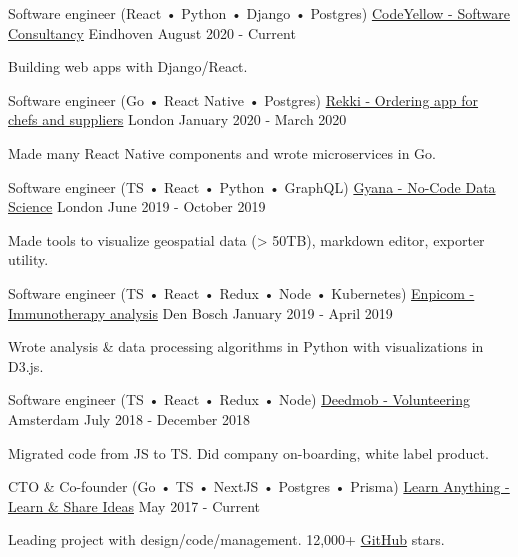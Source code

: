 
\begin{cventries}

  \cventry
    {Software engineer (React • Python • Django • Postgres)}
    {\href{https://codeyellow.nl}{CodeYellow - Software Consultancy}}
    {Eindhoven}
    {August 2020 - Current}
     {
      \begin{cvitems}
        \item {Building web apps with Django/React.}
      \end{cvitems}
    }

  \cventry
    {Software engineer (Go • React Native • Postgres)}
    {\href{https://www.rekki.com}{Rekki - Ordering app for chefs and suppliers}}
    {London}
    {January 2020 - March 2020}
     {
      \begin{cvitems}
        \item {Made many React Native components and wrote microservices in Go.}
      \end{cvitems}
    }

  \cventry
    {Software engineer (TS • React • Python • GraphQL)}
    {\href{https://www.gyana.com}{Gyana - No-Code Data Science}}
    {London}
    {June 2019 - October 2019}
     {
      \begin{cvitems}
        \item {Made tools to visualize geospatial data (> 50TB), markdown editor, exporter utility.}
      \end{cvitems}
    }

  \cventry
    {Software engineer (TS • React • Redux • Node • Kubernetes)}
    {\href{https://www.enpicom.com}{Enpicom - Immunotherapy analysis}}
    {Den Bosch}
    {January 2019 - April 2019}
     {
      \begin{cvitems}
        \item {Wrote analysis \& data processing algorithms in Python with visualizations in D3.js.}
      \end{cvitems}
    }

  \cventry
    {Software engineer (TS • React • Redux • Node)}
    {\href{https://www.deedmob.com}{Deedmob - Volunteering}}
    {Amsterdam}
    {July 2018 - December 2018}
     {
      \begin{cvitems}
        \item {Migrated code from JS to TS. Did company on-boarding, white label product.}
      \end{cvitems}
    }

  \cventry
    {CTO \& Co-founder (Go • TS • NextJS • Postgres • Prisma)}
    {\href{https://learn-anything.xyz}{Learn Anything - Learn \& Share Ideas}}
    {}
    {May 2017 - Current}
     {
      \begin{cvitems}
        \item {Leading project with design/code/management. 12,000+ \href{https://github.com/learn-anything/learn-anything}{GitHub} stars.}
      \end{cvitems}
    }

\end{cventries}

